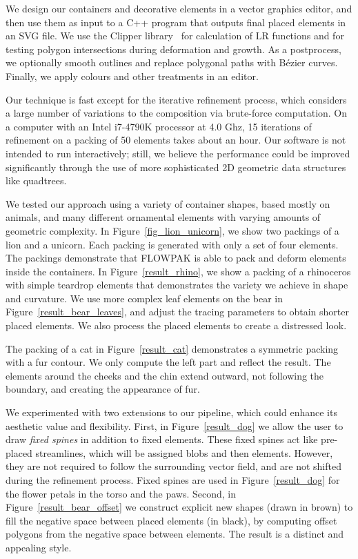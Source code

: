 We design our containers and decorative elements in a vector graphics 
editor, and then use them as input to a C++ program that outputs final
placed elements in an SVG file.  We use the Clipper library~\cite{ClipperLib}
for calculation of LR functions and for testing polygon intersections 
during deformation and growth.
As a postprocess, we optionally smooth outlines and replace polygonal
paths with B\'{e}zier curves.
Finally, we apply colours and other treatments in an editor.

Our technique is fast except for the iterative refinement process,
which considers a large number of variations to the composition via
brute-force computation. On a computer with an Intel i7-4790K processor at 4.0 Ghz,
 15 iterations
of refinement on a packing of 50 elements takes about an hour.  Our
software is not intended to run interactively; still, we believe the
performance could be improved significantly through the use of more
sophisticated 2D geometric data structures like quadtrees.

We tested our approach using a variety of container shapes, based mostly
on animals, and many different ornamental elements with varying amounts
of geometric complexity.
In Figure~\ref{fig_lion_unicorn}, we show two packings of a lion and a unicorn.
Each packing is generated with only a set of four elements.
The packings demonstrate that FLOWPAK is able to pack and deform
elements inside the containers.
In Figure~\ref{result_rhino},
we show a packing of a rhinoceros with simple teardrop elements
that demonstrates the variety we achieve in shape and curvature.
We use more complex leaf elements on the bear in 
Figure~\ref{result_bear_leaves}, and
adjust the tracing parameters to obtain shorter placed elements. 
We also process the placed elements to create a distressed look.

The packing of a cat in Figure~\ref{result_cat} demonstrates 
a symmetric packing with a fur contour. 
We only compute the left part and reflect the result.
The elements around the cheeks and the chin extend outward, not following the boundary, and creating the appearance of fur.

We experimented with two extensions to our pipeline, 
which could enhance its aesthetic value and flexibility.
First, in Figure~\ref{result_dog} we allow the user to draw 
\textit{fixed spines} in addition to fixed elements.  These fixed
spines act like pre-placed streamlines, which will be assigned blobs
and then elements.  However, they are not required to follow the
surrounding vector field, and are not shifted during the refinement
process.  Fixed spines are used in Figure~\ref{result_dog} for the 
flower petals in the torso and the paws.
Second, in Figure~\ref{result_bear_offset} we construct explicit new shapes
(drawn in brown)
to fill the negative space between placed elements (in black), 
by computing offset polygons from the negative space between elements. 
The result is a distinct and appealing style.  

